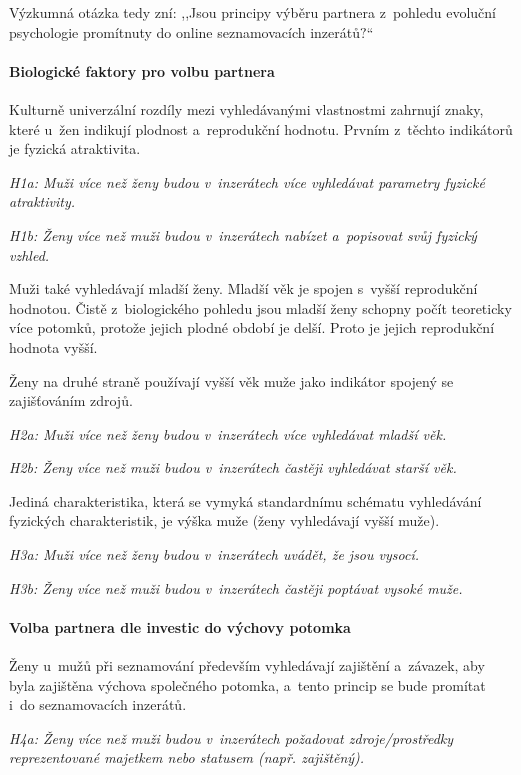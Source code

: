 \documentclass[a4paper, 12pt, notitlepage, oneside, numbers=noenddot]{report}
\begin{document}
Výzkumná otázka tedy zní: ,,Jsou principy výběru partnera z~pohledu
evoluční psychologie promítnuty do online seznamovacích inzerátů$?$``

\paragraph{Biologické faktory pro volbu partnera}

Kulturně univerzální rozdíly mezi vy\-hle\-dá\-vanými vlastnostmi zahrnují
znaky, které u~žen indikují plodnost a~reprodukční hodnotu.  Prvním
z~těchto indikátorů je fyzická atraktivita.

\emph{H1a: Muži více než ženy budou v~inzerátech více vyhledávat parametry fyzické
  atraktivity.}

\emph{H1b: Ženy více než muži budou v~inzerátech nabízet a~popisovat svůj
  fyzický vzhled.}

Muži také vyhledávají mladší ženy.  Mladší věk je spojen s~vyšší
reprodukční hodnotou.  Čistě z~biologického pohledu jsou mladší ženy
schopny počít teoreticky více potomků, protože jejich plodné období je
delší.  Proto je jejich reprodukční hodnota vyšší.

Ženy na druhé straně používají vyšší věk muže jako indikátor spojený
se zajišťováním zdrojů.

\emph{H2a: Muži více než ženy budou v~inzerátech více vyhledávat mladší věk.}

\emph{H2b: Ženy více než muži budou v~inzerátech častěji vyhledávat starší věk.}

Jediná charakteristika, která se vymyká standardnímu schématu
vyhledávání fyzických charakteristik, je výška muže (ženy vyhledávají
vyšší muže).

\emph{H3a: Muži více než ženy budou v~inzerátech uvádět, že jsou vysocí.}

\emph{H3b: Ženy více než muži budou v~inzerátech častěji poptávat vysoké muže.}

\paragraph{Volba partnera dle investic do výchovy potomka}

Ženy u~mužů při seznamování především vyhledávají zajištění a~závazek,
aby byla zajištěna výchova společného potomka, a~tento princip se bude
promítat i~do seznamovacích inzerátů.

\emph{H4a: Ženy více než muži budou v~inzerátech požadovat zdroje/prostředky
  reprezentované majetkem nebo statusem (např. zajištěný).}
\end{document}
